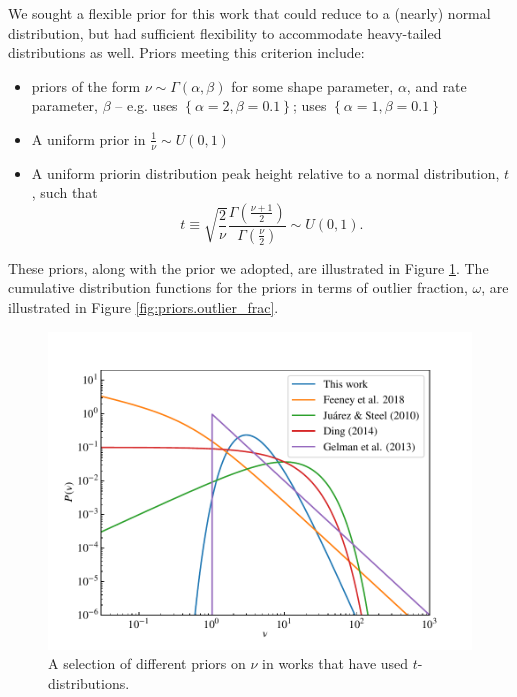 \documentclass[fleqn,usenatbib]{rasti}
\begin{document}
We sought a flexible prior for this work that could reduce to a (nearly) normal
distribution, but had sufficient flexibility to accommodate heavy-tailed
distributions as well. Priors meeting this criterion include:
\begin{itemize}
    \item priors of the form $\nu \sim \Gamma(\alpha, \beta)$ for
          some shape parameter, $\alpha$, and rate parameter, $\beta$ -- e.g.
          \citet{Juarez:2010} uses $\left\{\alpha = 2, \beta = 0.1\right\}$;
          \citet{Ding:2014} uses $\left\{\alpha = 1, \beta = 0.1\right\}$
    \item A uniform prior in $\frac1\nu \sim U(0, 1)$ \citep{Gelman:2013}
    \item A uniform prior\footnotemark in distribution peak height relative to a normal
    distribution, $t$, such that
    \begin{equation}
        t \equiv \sqrt{\frac2\nu}\frac{\Gamma\left(\frac{\nu + 1}{2}\right)}{\Gamma\left(\frac{\nu}{2}\right)} \sim U(0, 1).
    \end{equation}
\end{itemize}
These priors, along with the prior we adopted, are illustrated in Figure
\ref{fig:priors.pdf}. The cumulative distribution functions for the priors in
terms of outlier fraction, $\omega$, are illustrated in Figure
\ref{fig:priors.outlier_frac}.

\begin{figure}
	\includegraphics[width=\columnwidth]{graphics/pdf_nu}
    \caption{A selection of different priors on $\nu$ in works that have used
    $t$-distributions.}
    \label{fig:priors.pdf}
\end{figure}
\end{document}
